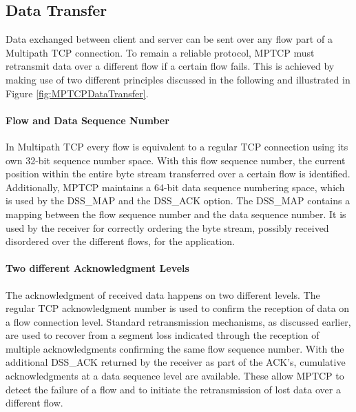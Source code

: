 \subsection*{Data Transfer}

Data exchanged between client and server can be sent over any flow part of a Multipath TCP connection. To remain a reliable protocol, MPTCP must retransmit data over a different flow if a certain flow fails. This is achieved by making use of two different principles discussed in the following and illustrated in Figure \ref{fig:MPTCPDataTransfer}.

\paragraph{Flow and Data Sequence Number}

In Multipath TCP every flow is equivalent to a regular TCP connection using its own 32-bit sequence number space. With this flow sequence number, the current position within the entire byte stream transferred over a certain flow is identified. Additionally, MPTCP maintains a 64-bit data sequence numbering space, which is used by the DSS\_MAP and the DSS\_ACK option. The DSS\_MAP contains a mapping between the flow sequence number and the data sequence number. It is used by the receiver for correctly ordering the byte stream, possibly received disordered over the different flows, for the application.

\paragraph{Two different Acknowledgment Levels}

The acknowledgment of received data happens on two different levels. The regular TCP acknowledgment number is used to confirm the reception of data on a flow connection level. Standard retransmission mechanisms, as discussed earlier, are used to recover from a segment loss indicated through the reception of multiple acknowledgments confirming the same flow sequence number. With the additional DSS\_ACK returned by the receiver as part of the ACK's, cumulative acknowledgments at a data sequence level are available. These allow MPTCP to detect the failure of a flow and to initiate the retransmission of lost data over a different flow.

